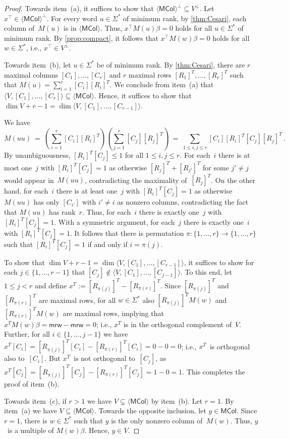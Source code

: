 \documentclass[11pt,a4paper]{amsart}
\newcommand{\spn}[1]{\mathord{\langle #1 \rangle}}
\newcommand{\mrw}{\mathsf{mrw}}
\newcommand{\MCol}{\mathsf{MCol}}
\theoremstyle{plain}
\theoremstyle{definition}
\theoremstyle{defC}
\theoremstyle{thmC}
\theoremstyle{plain}
\numberwithin{equation}{section}
\begin{document}
\begin{proof}
Towards item~(a), it suffices to show that $\spn{\MCol}^\bot \subseteq V^\bot$.
Let $x^\top \in \spn{\MCol}^\bot$.
For every word $u \in \Sigma^*$ of minimum rank, by \autoref{thm:Cesari}, each column of~$M(u)$ is in $\spn{\MCol}$.
Thus, $x^\top M(u) \beta = 0$ holds for all $u \in \Sigma^*$ of minimum rank.
By \autoref{prop:compact}, it follows that $x^\top M(w) \beta = 0$ holds for all $w \in \Sigma^*$, i.e., $x^\top \in V^\bot$.

Towards item~(b), let $u \in \Sigma^*$ be of minimum rank.
By \autoref{thm:Cesari}, there are $r$ maximal columns $[C_1], \ldots, [C_r]$ and $r$ maximal rows $[R_1]^T, \ldots, [R_r]^T$ such that $M(u) = \sum_{i=1}^r [C_i] [R_i]^T$.
We conclude from item~(a) that $\spn{V, [C_1], \ldots, [C_r]} \subseteq \spn{\MCol}$.
Hence, it suffices to show that $\dim V + r-1 = \dim \spn{V, [C_1], \ldots, [C_{r-1}]}$.

We have
\[
M(u u) \ = \ \left( \sum_{i=1}^r [C_i] [R_i]^T \right) \left( \sum_{j=1}^r [C_j] [R_j]^T \right)
\ = \ \sum_{1 \le i,j \le r} [C_i] [R_i]^T [C_j] [R_j]^T\,.
\]
By unambiguousness, $[R_i]^T [C_j] \le 1$ for all $1 \le i,j \le r$.
For each~$i$ there is at most one~$j$ with $[R_i]^T [C_j] = 1$ as otherwise $[R_j]^T + [R_{j'}]^T$ for some $j' \ne j$ would appear in~$M(u u)$, contradicting the maximality of~$[R_j]^T$.
On the other hand, for each~$i$ there is at least one~$j$ with $[R_i]^T [C_j] = 1$ as otherwise $M(u u)$ has only $[C_{i'}]$ with $i' \ne i$ as nonzero columns, contradicting the fact that $M(u u)$ has rank~$r$.
Thus, for each~$i$ there is exactly one~$j$ with $[R_i]^T [C_j] = 1$.
With a symmetric argument, for each~$j$ there is exactly one~$i$ with $[R_i]^T [C_j] = 1$.
It follows that there is permutation $\pi: \{1, \ldots, r\} \to \{1, \ldots, r\}$ such that $[R_i]^T [C_j] = 1$ if and only if $i = \pi(j)$.

To show that $\dim V + r-1 = \dim \spn{V, [C_1], \ldots, [C_{r-1}]}$, it suffices to show for each $j \in \{1, \ldots, r-1\}$ that $[C_j] \not\in \spn{V, [C_1], \ldots, [C_{j-1}]}$.
To this end, let $1 \le j < r$ and define $x^T := [R_{\pi(j)}]^T - [R_{\pi(r)}]^T$.
Since $[R_{\pi(j)}]^T$ and $[R_{\pi(r)}]^T$ are maximal rows, for all $w \in \Sigma^*$ also $[R_{\pi(j)}]^T M(w)$ and $[R_{\pi(r)}]^T M(w)$ are maximal rows, implying that $x^T M(w) \beta = \mrw - \mrw = 0$; i.e., $x^T$ is in the orthogonal complement of~$V$.
Further, for all $i \in \{1, \ldots, j-1\}$ we have $x^T [C_i] = [R_{\pi(j)}]^T [C_i] - [R_{\pi(r)}]^T [C_i] = 0-0 = 0$; i.e., $x^T$~is orthogonal also to~$[C_i]$.
But $x^T$~is not orthogonal to~$[C_j]$, as $x^T [C_j] = [R_{\pi(j)}]^T [C_j] - [R_{\pi(r)}]^T [C_j] = 1 - 0 = 1$.
This completes the proof of item~(b).

Towards item~(c), if $r>1$ we have $V \subsetneq \spn{\MCol}$ by item~(b).
Let $r=1$.
By item~(a) we have $V \subseteq \spn{\MCol}$.
Towards the opposite inclusion, let $y \in \MCol$.
Since $r=1$, there is $w \in \Sigma^*$ such that $y$ is the only nonzero column of~$M(w)$.
Thus, $y$~is a multiple of $M(w) \beta$.
Hence, $y \in V$.
\end{proof}
\end{document}
